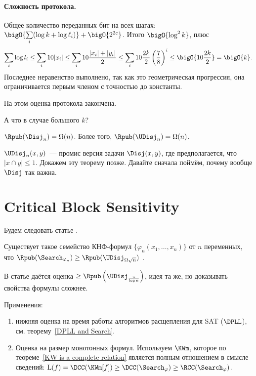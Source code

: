 \paragraph{Сложность протокола.} Общее количество переданных бит на всех шагах:
$\bigO{\sum\limits_i (\log k +  \log \ell_i)} + \bigO{2^{2c}}$. Итого $\bigO{\log^2 k}$, плюс
$$
    \sum_i \log l_i \le \sum_i 10|x_i| \le \sum_i 10\frac{|x_i|+|y_i|}{2} \le \sum_i
    10\frac{2k}{2}\left(\frac{7}{8}\right)^i \le \bigO{10\frac{2k}{2}} = \bigO{k}.
$$
Последнее неравенство выполнено, так как это геометрическая прогрессия, она ограничивается первым членом
с точностью до константы.

На этом оценка протокола закончена.


А что в случае большого $k$?
\begin{theorem}
    $\Rpub(\Disj_n) = \Omega(n)$. Более того, $\Rpub(\UDisj_n) = \Omega(n)$.
\end{theorem}


$\UDisj_n(x, y)$~--- промис версия задачи $\Disj(x, y)$, где предполагается, что $|x \cap y| \le 1$.
Докажем эту теорему позже. Давайте сначала поймём, почему вообще $\Disj$ так важна.

\section{Critical Block Sensitivity}

Будем следовать статье \cite{GP18-crit}.

\begin{theorem}
    Существует такое семейство КНФ-формул $\{\varphi_n(x_1, \ldots, x_n)\}$ от $n$ переменных, что
    $\Rpub(\Search_{\varphi_n}) \ge \Rpub(\UDisj_{\Omega{\sqrt{n}}})$ .
\end{theorem}

В статье даётся оценка $\ge \Rpub\left(\UDisj_{\frac{n}{\log n}}\right)$, идея та же, но доказывать
свойства формулы сложнее.

Применения:
\begin{enumerate}
    \item нижняя оценка на время работы алгоритмов расщепления для SAT ($\DPLL$), см. теорему~\ref{DPLL
        and Search}.
    \item Оценка на размер монотонных формул. Используем $\KWm$, которое по теореме~\ref{KW is a complete
        relation} является полным отношением в смысле сведений: $\mathrm{L}(f) = \DCC(\KWm[f]) \ge
        \DCC(\Search_{\varphi}) \ge \RCC(\Search_{\varphi})$. 
\end{enumerate}

